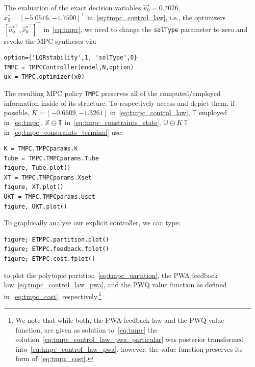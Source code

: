 \documentclass[letterpaper, 10 pt, conference]{ieeeconf}
\begin{document}
The evaluation of the exact decision variables $\hat{u}_{0}^{\star} = 0.7026$, $\hat{x}_{0}^{\star} = [-5.0516, -1.7500]^{\top}$ in~\eqref{eq:tmpc_control_law}, i.e., the optimizers $\left[ \hat{u}_{0}^{\star\top}, \hat{x}_{0}^{\star\top} \right]^{\top}$ in~\eqref{eq:tmpc}, we need to change the \texttt{solType} parameter to zero and revoke the MPC syntheses via:
\begin{lstlisting}[style=Matlab-editor]
option={'LQRstability',1, 'solType',0}
TMPC = TMPCController(model,N,option)
ux = TMPC.optimizer(x0)
\end{lstlisting}
The resulting MPC policy \texttt{TMPC} preserves all of the computed/employed information inside of its structure. To respectively access and depict them, if possible, $K = [-0.6609, -1.3261]$ in~\eqref{eq:tmpc_control_law}, $\mathbb{T}$ employed in~\eqref{eq:tmpc}, $\mathbb{X} \ominus \mathbb{T}$ in~\eqref{eq:tmpc_constraints_state}, $\mathbb{U} \ominus K \, \mathbb{T}$ in~\eqref{eq:tmpc_constraints_terminal} use:
\begin{lstlisting}[style=Matlab-editor]
K = TMPC.TMPCparams.K
Tube = TMPC.TMPCparams.Tube
figure, Tube.plot()
XT = TMPC.TMPCparams.Xset
figure, XT.plot()
UKT = TMPC.TMPCparams.Uset
figure, UKT.plot()
\end{lstlisting}

To graphically analyse our explicit controller, we can type:
\begin{lstlisting}[style=Matlab-editor]
figure; ETMPC.partition.plot()
figure; ETMPC.feedback.fplot()
figure; ETMPC.cost.fplot()
\end{lstlisting}
to plot the polytopic partition~\eqref{eq:tmpc_partition}, the PWA feedback law~\eqref{eq:tmpc_control_law_pwa}, and the PWQ value function as defined in~\eqref{eq:tmpc_cost}, respectively.\footnote{We note that while both, the PWA feedback law and the PWQ value function, are given as solution to~\eqref{eq:tmpc} the solution~\eqref{eq:tmpc_control_law_pwa_particular} was posterior transformed into~\eqref{eq:tmpc_control_law_pwa}, however, the value function preserves its form of~\eqref{eq:tmpc_cost}.}
\end{document}
